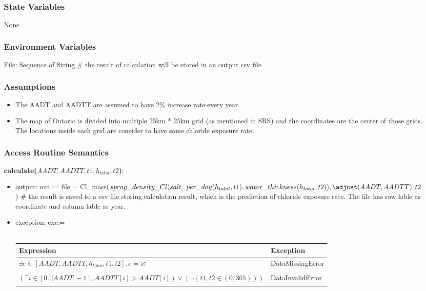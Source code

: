 \documentclass[12pt, titlepage]{article}
\begin{document}
\subsubsection{State Variables}
None
\subsubsection{Environment Variables}

File: Sequence of String \# the result of calculation will be stored in an output csv file.
\subsubsection{Assumptions}

\begin{itemize}
\item The AADT and AADTT are assumed to have 2\% increase rate every year.
\item The map of Ontario is divided into multiple 25km * 25km grid (as mentioned in SRS) and the coordinates are the center of those grids. The locations inside each grid are consider to have same chloride exposure rate.
\end{itemize}

\subsubsection{Access Routine Semantics}

\noindent \textbf{calculate($AADT, AADTT, t1, h_{total}, t2$)}:
\begin{itemize}
\item output: out :=  file = Cl\_mass($spray\_density\_Cl(salt\_per\_day(h_{total}, t1), \\ water\_thickness(h_{total}, t2)),\adjust(AADT, AADTT), t2$) \# the result is saved to a csv file storing calculation result, which is the prediction of chloride exposure rate. The file has row lable as coordinate and column lable as year. 
\item exception: exc:= \\ \\ 
 \begin{tabular}{p{10cm} p{3.5cm} }
 \hline
 \textbf{Expression} & \textbf{Exception}  \\
 \hline
     $\exists e \in [AADT, AADTT, h_{total}, t1, t2], e =\varnothing$ & DataMissingError  \\ \\

  \hline
     $(\exists i \in [0..|AADT|-1], AADTT[i] > AADT[i]) \lor (\neg (t1, t2 \in (0,365)))$   & DataInvalidError \\ \\

  \hline
 \end{tabular}

\end{itemize}
\end{document}
